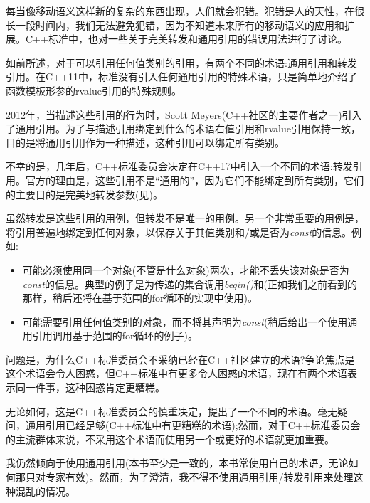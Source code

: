 每当像移动语义这样新的复杂的东西出现，人们就会犯错。犯错是人的天性，在很长一段时间内，我们无法避免犯错，因为不知道未来所有的移动语义的应用和扩展。C++标准中，也对一些关于完美转发和通用引用的错误用法进行了讨论。\par


如前所述，对于可以引用任何值类别的引用，有两个不同的术语:通用引用和转发引用。在C++11中，标准没有引入任何通用引用的特殊术语，只是简单地介绍了函数模板形参的rvalue引用的特殊规则。\par

2012年，当描述这些引用的行为时，Scott Meyers(C++社区的主要作者之一)引入了通用引用。为了与描述引用绑定到什么的术语右值引用和rvalue引用保持一致，目的是将通用引用作为一种描述，这种引用可以绑定所有类别。\par

不幸的是，几年后，C++标准委员会决定在C++17中引入一个不同的术语:转发引用。官方的理由是，这些引用不是“通用的”，因为它们不能绑定到所有类别，它们的主要目的是完美地转发参数(见)。\par

虽然转发是这些引用的用例，但转发不是唯一的用例。另一个非常重要的用例是，将引用普遍地绑定到任何对象，以保存关于其值类别和/或是否为\textit{const}的信息。例如:\par

\begin{itemize}
  \item 可能必须使用同一个对象(不管是什么对象)两次，才能不丢失该对象是否为\textit{const}的信息。典型的例子是为传递的集合调用\textit{begin()}和\textit{}(正如我们之前看到的那样，稍后还将在基于范围的for循环的实现中使用)。
  \item 可能需要引用任何值类别的对象，而不将其声明为\textit{const}(稍后给出一个使用通用引用调用基于范围的for循环的例子)。
\end{itemize}

问题是，为什么C++标准委员会不采纳已经在C++社区建立的术语?争论焦点是这个术语会令人困惑，但C++标准中有更多令人困惑的术语，现在有两个术语表示同一件事，这种困惑肯定更糟糕。\par

无论如何，这是C++标准委员会的慎重决定，提出了一个不同的术语。毫无疑问，通用引用已经足够(C++标准中有更糟糕的术语);然而，对于C++标准委员会的主流群体来说，不采用这个术语而使用另一个或更好的术语就更加重要。\par

我仍然倾向于使用通用引用(本书至少是一致的，本书常使用自己的术语，无论如何那只对专家有效)。然而，为了澄清，我不得不使用通用引用/转发引用来处理这种混乱的情况。\par

